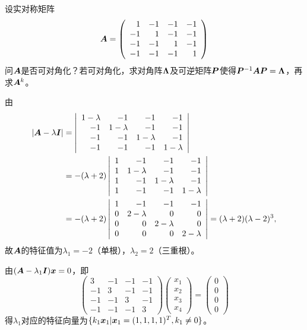 \begin{li}
  设实对称矩阵
  $$
  \boldsymbol{A}=\left(
    \begin{array}{rrrr}
      1&-1&-1&-1\\
      -1&1&-1&-1\\
      -1&-1&1&-1\\
      -1&-1&-1&1
    \end{array}
  \right)
  $$
  问$\boldsymbol{A}$是否可对角化？若可对角化，求对角阵$\boldsymbol{\Lambda}$及可逆矩阵$\boldsymbol{P}$使得$\boldsymbol{P}^{-1}\boldsymbol{A}\boldsymbol{P}=\boldsymbol{\Lambda}$，再求$\boldsymbol{A}^k$。
\end{li}
\begin{jie}
  由
  $$
  \begin{aligned}
  |\boldsymbol{A}-\lambda\boldsymbol{I}|&=
  \left|
    \begin{array}{rrrr}
      1-\lambda&-1&-1&-1\\
      -1&1-\lambda&-1&-1\\
      -1&-1&1-\lambda&-1\\
      -1&-1&-1&1-\lambda
    \end{array}
  \right|\\
  &=-(\lambda+2)
  \left|
    \begin{array}{rrrr}
      1&-1&-1&-1\\
      1&1-\lambda&-1&-1\\
      1&-1&1-\lambda&-1\\
      1&-1&-1&1-\lambda
    \end{array}
  \right|\\
  &=-(\lambda+2)
  \left|
    \begin{array}{rrrr}
      1&-1&-1&-1\\
      0&2-\lambda&0&0\\
      0&0&2-\lambda&0\\
      0&0&0&2-\lambda
    \end{array}
  \right|=(\lambda+2)(\lambda-2)^3,
  \end{aligned}
  $$
  故$\boldsymbol{A}$的特征值为$\lambda_1=-2$（单根），$\lambda_2=2$（三重根）。

  由$(\boldsymbol{A}-\lambda_1\boldsymbol{I}){\boldsymbol{x}}=0$，即
  $$
  \left(
    \begin{array}{rrrr}
      3&-1&-1&-1\\
      -1&3&-1&-1\\
      -1&-1&3&-1\\
      -1&-1&-1&3
    \end{array}
  \right)
  \left(
    \begin{array}{c}
      x_1\\x_2\\x_3\\x_4
    \end{array}
  \right)=
  \left(
    \begin{array}{c}
      0\\0\\0\\0
    \end{array}
  \right)
  $$
  得$\lambda_1$对应的特征向量为$\{k_1{\boldsymbol{x}}_1|{\boldsymbol{x}}_1=(1,1,1,1)^T, k_1\ne 0\}$。


\end{jie}
